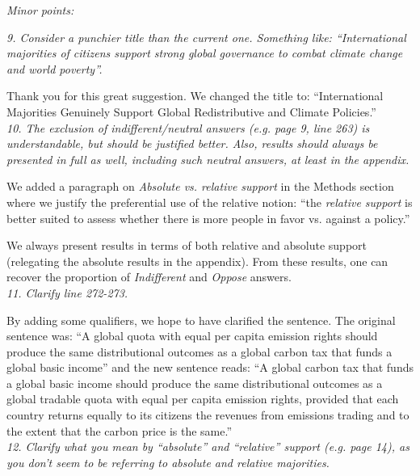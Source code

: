 \documentclass[12pt,english]{article}
\begin{document}
\textit{Minor points:}

\textit{9. Consider a punchier title than the current one. Something like: “International majorities of citizens support strong global governance to combat climate change and world poverty”.}

Thank you for this great suggestion. We changed the title to: ``International Majorities Genuinely Support Global Redistributive and Climate Policies.''
~\\

\textit{10. The exclusion of indifferent/neutral answers (e.g. page 9, line 263) is understandable, but should be justified better. Also, results should always be presented in full as well, including such neutral answers, at least in the appendix.} %

We added a paragraph on \textit{Absolute vs. relative support} in the Methods section where we justify the preferential use of the relative notion: ``the \textit{relative support} is better suited to assess whether there is more people in favor vs. against a policy.''

We always present results in terms of both relative and absolute support (relegating the absolute results in the appendix). From these results, one can recover the proportion of \textit{Indifferent} and \textit{Oppose} answers. 
~\\


\textit{11. Clarify line 272-273.}

By adding some qualifiers, we hope to have clarified the sentence. The original sentence was: ``A global quota with equal per capita emission rights should produce the same distributional outcomes as a global carbon tax that funds a global basic income'' and the new sentence reads: ``A global carbon tax that funds a global basic income should produce the same distributional outcomes as a global tradable quota with equal per capita emission rights, provided that each country returns equally to its citizens the revenues from emissions trading and to the extent that the carbon price is the same.''
~\\

\textit{12. Clarify what you mean by “absolute” and “relative” support (e.g. page 14), as you don’t seem to be referring to absolute and relative majorities.} %
\end{document}
